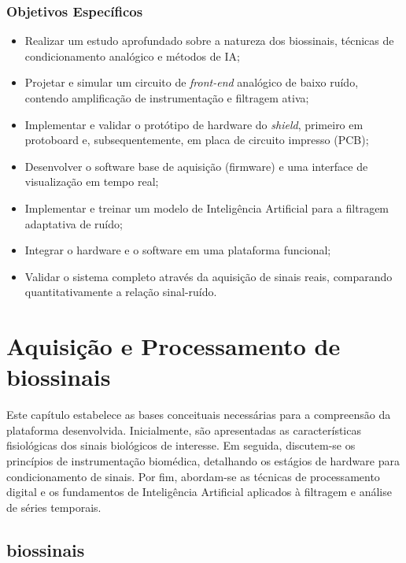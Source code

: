 \documentclass[tcc,capa]{texufpel}
\begin{document}
\subsection{Objetivos Específicos}
\begin{itemize}
    \item Realizar um estudo aprofundado sobre a natureza dos biossinais, técnicas de condicionamento analógico e métodos de IA;
    \item Projetar e simular um circuito de \textit{front-end} analógico de baixo ruído, contendo amplificação de instrumentação e filtragem ativa;
    \item Implementar e validar o protótipo de hardware do \textit{shield}, primeiro em protoboard e, subsequentemente, em placa de circuito impresso (PCB);
    \item Desenvolver o software base de aquisição (firmware) e uma interface de visualização em tempo real;
    \item Implementar e treinar um modelo de Inteligência Artificial para a filtragem adaptativa de ruído;
    \item Integrar o hardware e o software em uma plataforma funcional;
    \item Validar o sistema completo através da aquisição de sinais reais, comparando quantitativamente a relação sinal-ruído.
\end{itemize}

\chapter{Aquisição e Processamento de biossinais}

Este capítulo estabelece as bases conceituais necessárias para a compreensão da plataforma desenvolvida. Inicialmente, são apresentadas as características fisiológicas dos sinais biológicos de interesse. Em seguida, discutem-se os princípios de instrumentação biomédica, detalhando os estágios de hardware para condicionamento de sinais. Por fim, abordam-se as técnicas de processamento digital e os fundamentos de Inteligência Artificial aplicados à filtragem e análise de séries temporais.

\section{biossinais}
\end{document}
